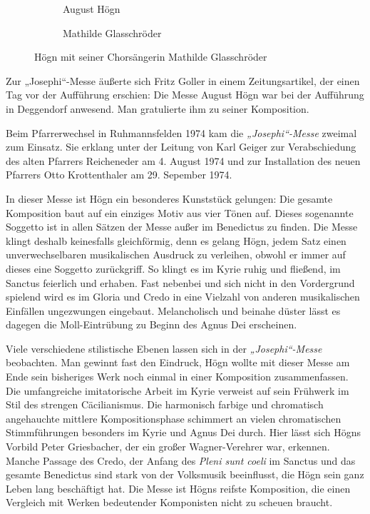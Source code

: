 \begin{figure}
\begin{subfigure}[b]{0.5\linewidth}
\centering
{}
\caption{August Högn}
\end{subfigure}
%
\begin{subfigure}[b]{0.5\linewidth}
\centering
{}
\caption{Mathilde Glasschröder}
\end{subfigure}
%
\caption{Högn mit seiner Chorsängerin Mathilde Glasschröder}
\end{figure}

Zur „Josephi“-Messe äußerte sich Fritz Goller in einem Zeitungsartikel,
der einen Tag vor der Aufführung erschien: Die
Messe  August Högn war bei der Aufführung in Deggendorf
anwesend. Man gratulierte ihm zu seiner Komposition.

Beim Pfarrerwechsel in Ruhmannsfelden 1974 kam die
\textit{„Josephi“-Messe} zweimal zum Einsatz. Sie erklang unter der
Leitung von Karl Geiger zur Verabschiedung des alten Pfarrers
Reicheneder am 4. August 1974 und zur Installation des neuen Pfarrers
Otto Krottenthaler am 29. Sepember 1974.

In dieser Messe ist Högn ein besonderes Kunststück gelungen: Die
gesamte Komposition baut auf ein einziges Motiv aus vier Tönen auf.
Dieses sogenannte Soggetto ist in allen Sätzen der Messe außer im
Benedictus zu finden. Die Messe klingt deshalb keinesfalls
gleichförmig, denn es gelang Högn, jedem Satz einen unverwechselbaren
musikalischen Ausdruck zu verleihen, obwohl er immer auf dieses eine
Soggetto zurückgriff. So klingt es im Kyrie ruhig und fließend, im
Sanctus feierlich und erhaben. Fast nebenbei und sich nicht in den
Vordergrund spielend wird es im Gloria und Credo in eine Vielzahl von
anderen musikalischen Einfällen ungezwungen eingebaut. Melancholisch
und beinahe düster lässt es dagegen die Moll-Eintrübung zu Beginn des
Agnus Dei erscheinen.

Viele verschiedene stilistische Ebenen lassen sich in der
\textit{„Josephi“-Messe} beobachten. Man gewinnt fast den Eindruck,
Högn wollte mit dieser Messe am Ende sein bisheriges Werk noch einmal
in einer Komposition zusammenfassen. Die umfangreiche imitatorische
Arbeit im Kyrie verweist auf sein Frühwerk im Stil des strengen
Cäcilianismus. Die harmonisch farbige und chromatisch angehauchte
mittlere Kompositionsphase schimmert an vielen chromatischen
Stimmführungen besonders im Kyrie und Agnus Dei durch. Hier lässt sich
Högns Vorbild Peter Griesbacher, der ein großer Wagner-Verehrer war,
erkennen. Manche Passage des Credo, der Anfang des \textit{Pleni sunt
coeli} im Sanctus und das gesamte Benedictus sind stark von der
Volksmusik beeinflusst, die Högn sein ganz Leben lang beschäftigt
hat. Die Messe ist Högns reifste Komposition, die einen Vergleich mit
Werken bedeutender Komponisten nicht zu scheuen braucht.

